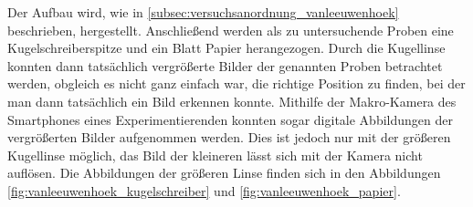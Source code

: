 \documentclass[ngerman]{scrartcl}
\begin{document}
Der Aufbau wird, wie in \autoref{subsec:versuchsanordnung_vanleeuwenhoek} beschrieben, hergestellt. Anschließend werden als zu untersuchende Proben eine Kugelschreiberspitze und ein Blatt Papier herangezogen. Durch die Kugellinse konnten dann tatsächlich vergrößerte Bilder der genannten Proben betrachtet werden, obgleich es nicht ganz einfach war, die richtige Position zu finden, bei der man dann tatsächlich ein Bild erkennen konnte. Mithilfe der Makro-Kamera des Smartphones eines Experimentierenden konnten sogar digitale Abbildungen der vergrößerten Bilder aufgenommen werden. Dies ist jedoch nur mit der größeren Kugellinse möglich, das Bild der kleineren lässt sich mit der Kamera nicht auflösen. Die Abbildungen der größeren Linse finden sich in den Abbildungen \ref{fig:vanleeuwenhoek_kugelschreiber} und \ref{fig:vanleeuwenhoek_papier}.
%
\setcapindent{0pt}
\end{document}
